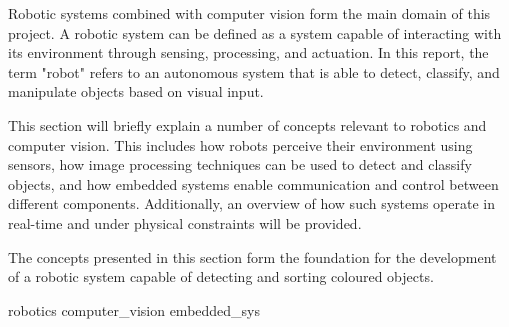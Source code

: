 
Robotic systems combined with computer vision form the main domain of this project. A
robotic system can be defined as a system capable of interacting with its environment through
sensing, processing, and actuation. In this report, the term "robot" refers to an autonomous
system that is able to detect, classify, and manipulate objects based on visual input.

This section will briefly explain a number of concepts relevant to robotics and computer
vision. This includes how robots perceive their environment using sensors, how image processing
techniques can be used to detect and classify objects, and how embedded systems enable
communication and control between different components. Additionally, an overview of how
such systems operate in real-time and under physical constraints will be provided.

The concepts presented in this section form the foundation for the development of a robotic
system capable of detecting and sorting coloured objects.


{robotics}
{computer_vision}
{embedded_sys}